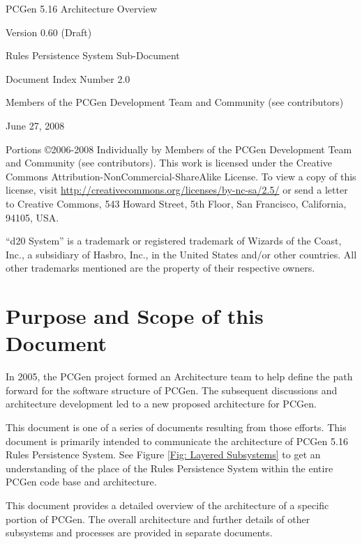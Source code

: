 \documentclass[12pt,letterpaper]{article}
\newcommand{\lastupdate}{June 27, 2008}
\newcommand{\versionEOS}{0.60}
\newcommand{\docnumEOS}{2.0}
\newcommand{\pcgenversEOS}{5.16}
\newcommand{\systemEOS}{Rules Persistence System}
\newcommand{\system}{\systemEOS{} }
\newcommand{\version}{\versionEOS{} }
\newcommand{\docnum}{\docnumEOS{} }
\newcommand{\pcgenvers}{\pcgenversEOS{} }
\newcommand{\nsection}[1]{\newpage \section{#1}}
\newcommand{\lnsection}[1]{\label{#1}\nsection{#1}}
\newcommand{\authors}{Members of the PCGen Development Team and Community (see contributors)}
\begin{document}
\begin{center}

\vspace*{2.5in}
{ \Huge PCGen 5.16 Architecture Overview }

{ \huge Version \version (Draft) }

{ \huge \system Sub-Document }

{ \Large Document Index Number \docnum }

{ \large \authors }

\lastupdate

\end{center}

\vspace*{2.5in}

\noindent Portions \copyright  2006-2008 Individually by \authors.
This work is licensed under the Creative Commons Attribution-NonCommercial-ShareAlike License.
To view a copy of this license, visit \url{http://creativecommons.org/licenses/by-nc-sa/2.5/}
or send a letter to Creative Commons, 543 Howard Street, 5th Floor,
San Francisco, California, 94105, USA.

\noindent ``d20 System'' is a trademark or registered trademark 
of Wizards of the Coast, Inc., a subsidiary of Hasbro, Inc., in the United States and/or other countries.
All other trademarks mentioned are the property of their respective owners.

\newpage
\pagestyle{plain}
\setcounter{page}{1}
\tableofcontents

\listoftables
\listoffigures

\lnsection{Purpose and Scope of this Document}
\setcounter{page}{1}

In 2005, the PCGen project formed an Architecture team to help define the
path forward for the software structure of PCGen.  The subsequent discussions
and architecture development led to a new proposed architecture for PCGen.

This document is one of a series of documents resulting from those efforts.
This document is primarily intended to
communicate the architecture of PCGen \pcgenvers \systemEOS.  See Figure 
\ref{Fig: Layered Subsystems} to get an understanding of the place of the \system
within the entire PCGen code base and architecture.   

This document provides a detailed overview of the architecture of a specific
portion of PCGen.  The overall architecture and further details of
other subsystems and processes are provided in separate documents.
\end{document}
